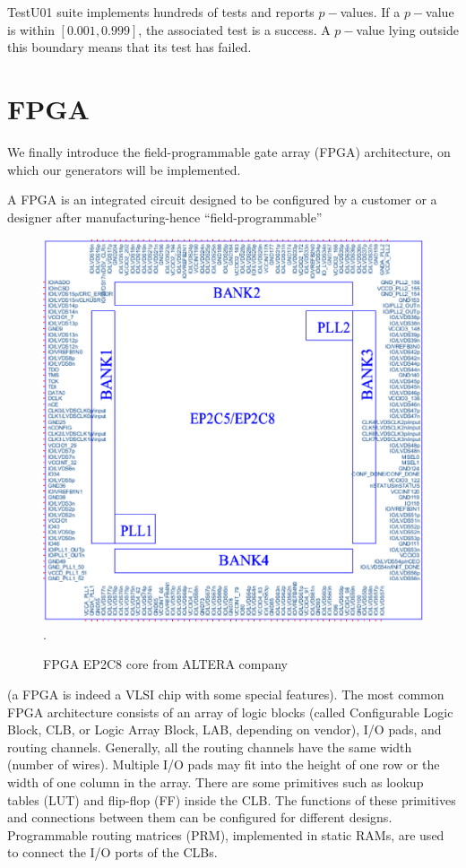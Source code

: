 TestU01 suite implements hundreds of tests and reports $p-$values. If a $p-$value is within $[0.001,0.999]$, the associated test is a success. A $p-$value lying outside this boundary means that its test has failed. %




\section{FPGA}
We finally introduce the field-programmable gate array (FPGA) architecture, on which our generators will be
implemented. 

A FPGA is an integrated circuit designed to be configured by a customer or a designer after manufacturing-hence ``field-programmable'' 
\begin{figure}
\centering
\includegraphics[width=5in]{fpga_scheme.eps}
\DeclareGraphicsExtensions.
\caption{FPGA EP2C8 core from ALTERA company}
\label{fpga_scheme}
\end{figure}
(a FPGA is indeed a VLSI chip with some special features).
The most common FPGA architecture consists of an array of logic blocks (called Configurable Logic Block, CLB, or Logic Array Block, LAB, depending on vendor), I/O pads, and routing channels. Generally, all the routing channels have the same width (number of wires). Multiple I/O pads may fit into the height of one row or the width of one column in the array. There are some primitives such as lookup tables (LUT) and flip-flop (FF) inside the CLB. The functions of these primitives and connections between them can be configured for different designs. Programmable routing matrices (PRM), implemented in static RAMs, are used to connect the I/O ports of the CLBs.

